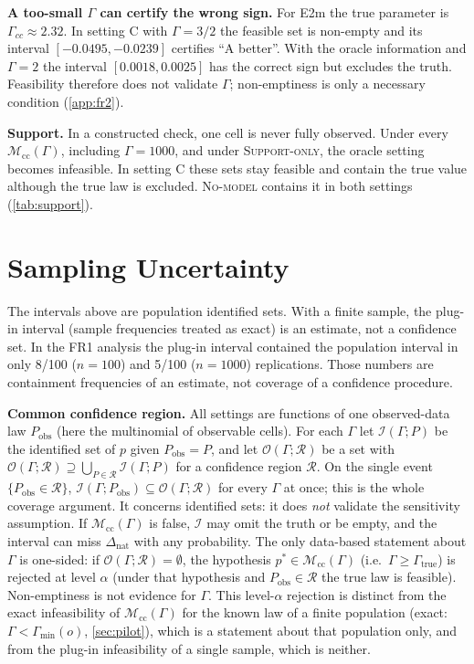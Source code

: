 \documentclass{article}
\theoremstyle{plain}
\theoremstyle{definition}
\theoremstyle{remark}
\newcommand{\Dnat}{\Delta_{\mathrm{nat}}}
\newcommand{\Mcc}{\mathcal{M}_{\mathrm{cc}}}
\begin{document}
\textbf{A too-small $\Gamma$ can certify the wrong sign.} For E2m the true
parameter is $\Gamma_{cc}\approx 2.32$. In setting C with $\Gamma=3/2$ the
feasible set is non-empty and its interval $[-0.0495,-0.0239]$ certifies ``A
better''. With the oracle information and $\Gamma=2$ the interval
$[0.0018,0.0025]$ has the correct sign but excludes the truth. Feasibility
therefore does not validate $\Gamma$; non-emptiness is only a necessary
condition (\cref{app:fr2}).

\textbf{Support.} In a constructed check, one cell is never fully observed.
Under every $\Mcc(\Gamma)$, including $\Gamma=1000$, and under
\textsc{Support-only}, the oracle setting becomes infeasible. In setting C
these sets stay feasible and contain the true value although the true law is
excluded. \textsc{No-model} contains it in both settings (\cref{tab:support}).

\section{Sampling Uncertainty}
\label{sec:sampling}

The intervals above are population identified sets. With a finite sample,
the plug-in interval (sample frequencies treated as exact) is an estimate,
not a confidence set. In the FR1 analysis the plug-in interval contained the
population interval in only 8/100 ($n=100$) and 5/100 ($n=1000$) replications.
Those numbers are containment frequencies of an estimate, not coverage of a
confidence procedure.

\textbf{Common confidence region.} All settings are functions of one
observed-data law $P_{\mathrm{obs}}$ (here the multinomial of observable
cells). For each $\Gamma$ let $\mathcal{I}(\Gamma;P)$ be the identified set of
$p$ given $P_{\mathrm{obs}}=P$, and let $\mathcal{O}(\Gamma;\mathcal{R})$ be a
set with $\mathcal{O}(\Gamma;\mathcal{R})\supseteq\bigcup_{P\in\mathcal{R}}\mathcal{I}(\Gamma;P)$
for a confidence region $\mathcal{R}$. On the single event
$\{P_{\mathrm{obs}}\in\mathcal{R}\}$, $\mathcal{I}(\Gamma;P_{\mathrm{obs}})\subseteq
\mathcal{O}(\Gamma;\mathcal{R})$ for every $\Gamma$ at once; this is the whole
coverage argument. It concerns identified sets: it does \emph{not} validate
the sensitivity assumption. If $\Mcc(\Gamma)$ is false, $\mathcal{I}$ may omit
the truth or be empty, and the interval can miss $\Dnat$ with any
probability. The only data-based statement about $\Gamma$ is one-sided:
if $\mathcal{O}(\Gamma;\mathcal{R})=\emptyset$, the hypothesis
$p^*\in\Mcc(\Gamma)$ (i.e.\ $\Gamma\ge\Gamma_{\mathrm{true}}$) is rejected at
level $\alpha$ (under that hypothesis and $P_{\mathrm{obs}}\in\mathcal{R}$ the
true law is feasible). Non-emptiness is not evidence for $\Gamma$. This
level-$\alpha$ rejection is distinct from the exact infeasibility of
$\Mcc(\Gamma)$ for the known law of a finite population (exact:
$\Gamma<\Gamma_{\min}(o)$, \cref{sec:pilot}), which is a statement about that
population only, and from the plug-in infeasibility of a single sample,
which is neither.
\end{document}

